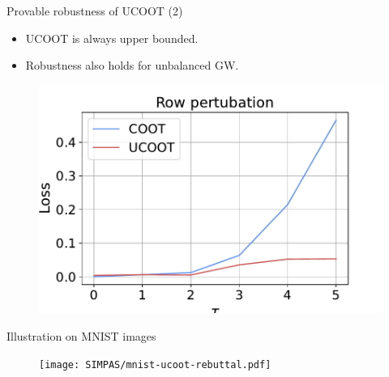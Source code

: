 \documentclass{beamer}
\begin{document}
\begin{frame}{Provable robustness of UCOOT (2)}
\begin{minipage}[t]{0.6\linewidth}
  \begin{itemize}
    \item UCOOT is always upper bounded.
    \item Robustness also holds for unbalanced GW.
  \end{itemize}
\end{minipage}%
\hfill%
\hspace{-6cm}
\begin{minipage}[t]{0.5\linewidth}
  \vspace{-0.3cm}
  \begin{figure}
    \centering
    \includegraphics[width=\linewidth, keepaspectratio=true]{SIMPAS/robustness_2.pdf}
  \end{figure}
\end{minipage}

\end{frame}

\begin{frame}{Illustration on MNIST images}
\scriptsize
\begin{figure}
    \centering
    \texttt{[image: SIMPAS/mnist-ucoot-rebuttal.pdf]}
    \vspace*{-1cm}
\end{figure}
\end{frame}
\end{document}
